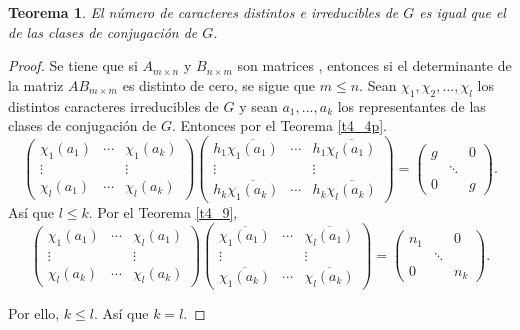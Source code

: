 \documentclass[12pt]{book}
\newtheorem{theorem}{Teorema}[section]
\theoremstyle{definition}
\newcounter{in}
\begin{document}
\begin{theorem}
  \label{t4_10}
  El número de caracteres distintos e irreducibles de $G$ es
  igual que el de las clases de conjugación de $G$.
\end{theorem}
\begin{proof}
  Se tiene que si $A_{m\times n}$ y $B_{n\times m}$ son matrices , entonces si el
  determinante de la matriz $AB_{m\times m}$ es distinto de cero, se sigue que $m \leq n$.
  Sean $\chi_{1}, \chi_{2},...,\chi_{l}$ los distintos caracteres irreducibles de $G$ y sean $a_{1},...,a_{k}$ los representantes de las clases de conjugación de $G$. Entonces por el Teorema \ref{t4_4p}.
  \begin{equation}
    \label{eq:56}
    \begin{pmatrix}
    \chi_{1}(a_{1}) & \cdots & \chi_{1}(a_{k}) \\ 
    \vdots &  & \vdots \\
    \chi_{l}(a_{1}) & \cdots & \chi_{l}(a_{k})
  \end{pmatrix}
  \begin{pmatrix}
    h_{1} \overline{\chi_{1}(a_{1})} & \cdots & h_{1} \overline{\chi_{l}(a_{1})} \\ 
    \vdots &  & \vdots \\
    h_{k} \overline{\chi_{1}(a_{k})} & \cdots & h_{k} \overline{\chi_{l}(a_{k})}  
  \end{pmatrix}
  =
  \begin{pmatrix}
   g & & 0\\ 
     & \ddots & \\
     0 &  & g
   \end{pmatrix}
   .
  \end{equation}
  Así que $l \leq k$. Por el Teorema \ref{t4_9},
  \begin{equation}
    \label{eq:57}
    \begin{pmatrix}
    \chi_{1}(a_{1}) & \cdots & \chi_{l}(a_{1}) \\ 
    \vdots &  & \vdots \\
    \chi_{l}(a_{k}) & \cdots & \chi_{l}(a_{k})
  \end{pmatrix}
  \begin{pmatrix}
     \overline{\chi_{1}(a_{1})} & \cdots &  \overline{\chi_{l}(a_{1})} \\ 
    \vdots &  & \vdots \\
     \overline{\chi_{1}(a_{k})} & \cdots &  \overline{\chi_{l}(a_{k})}  
   \end{pmatrix}
   =
  \begin{pmatrix}
   n_{1} & & 0\\ 
     & \ddots & \\

     0 &  & n_{k}
   \end{pmatrix}
   .
  \end{equation}

Por ello, $k \leq l$. Así que $k=l$.
\end{proof}
\end{document}

